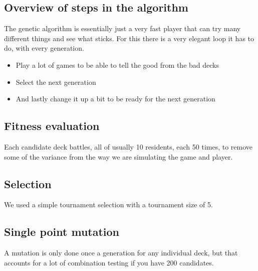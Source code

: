 \subsection{Overview of steps in the algorithm}
\label{sec:method:genalg:overview}
The genetic algorithm is essentially just a very fast player that can try many different things and see what sticks. For this there is a very elegant loop it has to do, with every generation.\\
\begin{itemize}
	\item Play a lot of games to be able to tell the good from the bad decks\\
	\item Select the next generation\\
	\item And lastly change it up a bit to be ready for the next generation\\
\end{itemize}


\subsection{Fitness evaluation}
\label{sec:method:genalg:fitness}
Each candidate deck battles, all of usually 10 residents, each 50 times, to remove some of the variance from the way we are simulating the game and player.

\subsection{Selection}
\label{sec:method:genalg:selection}
We used a simple tournament selection with a tournament size of 5.

\subsection{Single point mutation}
\label{sec:method:genalg:mutation}
A mutation is only done once a generation for any individual deck, but that accounts for a lot of combination testing if you have 200 candidates.

